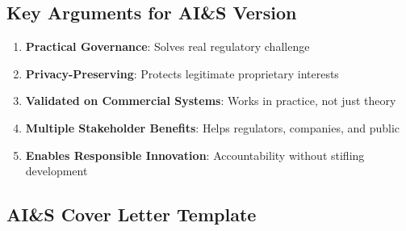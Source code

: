 \documentclass[12pt]{article}
\begin{document}
\subsection{Key Arguments for AI\&S Version}

\begin{enumerate}[leftmargin=*]
\item \textbf{Practical Governance}: Solves real regulatory challenge
\item \textbf{Privacy-Preserving}: Protects legitimate proprietary interests
\item \textbf{Validated on Commercial Systems}: Works in practice, not just theory
\item \textbf{Multiple Stakeholder Benefits}: Helps regulators, companies, and public
\item \textbf{Enables Responsible Innovation}: Accountability without stifling development
\end{enumerate}

\subsection{AI\&S Cover Letter Template}
\end{document}

